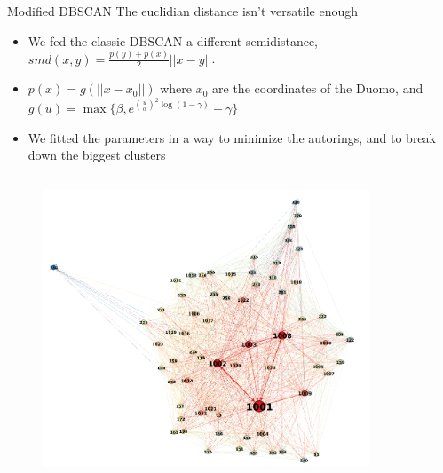 \documentclass{beamer}
\begin{document}
\begin{frame}{Modified DBSCAN}
The euclidian distance isn't versatile enough
\begin{itemize}
	\item We fed the classic DBSCAN a different \alert{semidistance}, $ smd(x,y) = \frac{p(y)+p(x)}{2}||x-y|| $.
	\item $p(x) = g(||x-x_0||)$ where $x_0$ are the coordinates of the Duomo, and $g(u) = \max\{\beta, e^{(\frac{u}{\alpha})^2\log{(1-\gamma)}}+\gamma\}$ 
	\item We fitted the parameters in a way to minimize the autorings, and to break down the biggest clusters
\end{itemize}
\end{frame}

\begin{frame}
\begin{columns}
	\begin{column}{.5\linewidth}
		\begin{figure}[H]
			\centering
			\includegraphics[width=1\linewidth]{pictures/old_model_gephi.png} 
		\end{figure}
	\end{column}
\begin{column}{.5\linewidth}
\begin{figure}[H]
	\centering

\end{figure}
\end{column}
\end{columns}
\end{frame}
\end{document}
